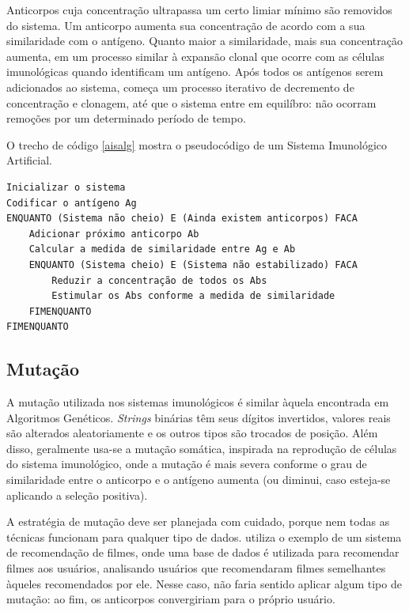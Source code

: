 Anticorpos cuja concentração ultrapassa um certo limiar mínimo são removidos do sistema. Um anticorpo aumenta sua concentração de acordo com a sua similaridade com o antígeno. Quanto maior a similaridade, mais sua concentração aumenta, em um processo similar à expansão clonal que ocorre com as células imunológicas quando identificam um antígeno. Após todos os antígenos serem adicionados ao sistema, começa um processo iterativo de decremento de concentração e clonagem, até que o sistema entre em equilíbro: não ocorram remoções por um determinado período de tempo.

O trecho de código \ref{aisalg} mostra o pseudocódigo de um Sistema Imunológico Artificial.

\begin{lstlisting}[caption=Pseudo código de um Sistema Imunológico Artificial \cite{Aickelin2005},label=aisalg]
Inicializar o sistema
Codificar o antígeno Ag
ENQUANTO (Sistema não cheio) E (Ainda existem anticorpos) FACA
    Adicionar próximo anticorpo Ab
    Calcular a medida de similaridade entre Ag e Ab
    ENQUANTO (Sistema cheio) E (Sistema não estabilizado) FACA
        Reduzir a concentração de todos os Abs
        Estimular os Abs conforme a medida de similaridade
    FIMENQUANTO
FIMENQUANTO
\end{lstlisting}

\subsection{Mutação}

A mutação utilizada nos sistemas imunológicos é similar àquela encontrada em Algoritmos Genéticos. \emph{Strings} binárias têm seus dígitos invertidos, valores reais são alterados aleatoriamente e os outros tipos são trocados de posição. Além disso, geralmente usa-se a mutação somática, inspirada na reprodução de células do sistema imunológico, onde a mutação é mais severa conforme o grau de similaridade entre o anticorpo e o antígeno aumenta (ou diminui, caso esteja-se aplicando a seleção positiva). 

A estratégia de mutação deve ser planejada com cuidado, porque nem todas as técnicas funcionam para qualquer tipo de dados. \citet{Aickelin2005} utiliza o exemplo de um sistema de recomendação de filmes, onde uma base de dados é utilizada para recomendar filmes aos usuários, analisando usuários que recomendaram filmes semelhantes àqueles recomendados por ele. Nesse caso, não faria sentido aplicar algum tipo de mutação: ao fim, os anticorpos convergiriam para o próprio usuário.

